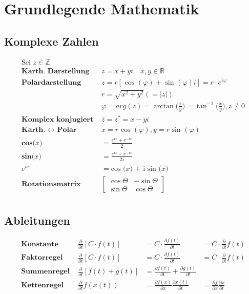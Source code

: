 \documentclass[8pt]{article}
\begin{document}
	\section{Grundlegende Mathematik}
		\subsection{Komplexe Zahlen}
			\begin{align*}
				\text{Sei }z \in \mathbb{Z} \text{ }& \\
				\textbf{Karth. Darstellung } 			& z = x + yi \quad x, y \in \mathbb{R} \\
				\textbf{Polardarstellung } 				& z = r [ \text{ cos }(\varphi) + \text{ sin }(\varphi)i ] = r \cdot e^{i \varphi} \\
														& r = \sqrt{x^2 + y^2} (= |z|) \\
														& \varphi = arg(z) = \arctan{} \Big(\frac{x}{y}\Big) = \tan^{-1} \Big(\frac{x}{y}\Big), z \neq 0 \\
				\textbf{Komplex konjugiert } 			& \overline{z} = z^{*} = x - yi \\
				\textbf{Karth. $\leftrightarrow$ Polar }& x = r \text{ cos }(\varphi), y = r \text{ sin }(\varphi) \\
				\textbf{cos($x$) } & = \frac{e^{i x} + e^{-i x}}{2}\\
				\textbf{sin($x$) } & = \frac{e^{i x} - e^{-i x}}{2i}\\
				\textbf{$e^{ix}$ } & = \text{cos ($x$) + i sin ($x$)}\\
				\textbf{Rotationsmatrix } & \begin{bmatrix}\cos \Theta & -\sin \Theta \\ \sin \Theta & \cos \Theta \end{bmatrix}\\
			\end{align*}
		\subsection{Ableitungen}
			\begin{align*}
				\textbf{Konstante } 	& \frac{\partial}{\partial t} [C \cdot f(t)] & = C \cdot \frac{\partial f(t)}{\partial t} & = C \cdot \frac{\partial}{\partial t} f(t)\\
				\textbf{Faktorregel } 	& \frac{\partial}{\partial t} [C \cdot f(t)] & = C \cdot \frac{\partial f(t)}{\partial t} & = C \cdot \frac{\partial}{\partial t} f(t)\\
				\textbf{Summenregel } 	& \frac{\partial}{\partial t} [f(t) + g(t)] & = \frac{\partial f(t)}{\partial t} + \frac{\partial g(t)}{\partial t} & \\
				\textbf{Kettenregel } 	& \frac{\partial}{\partial t} f(x(t)) & = \frac{\partial f(x)}{\partial x} \frac{\partial x(t)}{\partial t} & = \frac{\partial f}{\partial x}\frac{\partial x}{\partial t}\\
			\end{align*}
\end{document}

